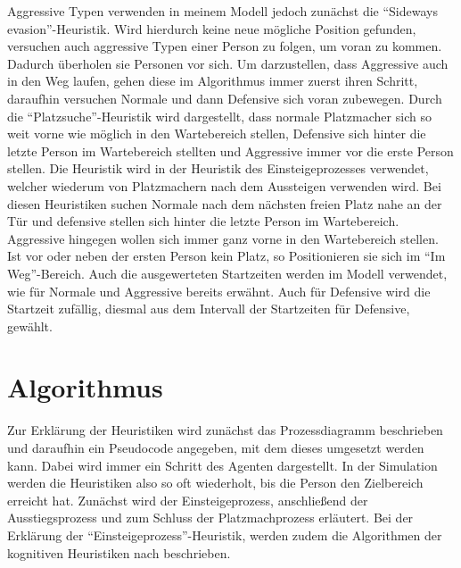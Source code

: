 Aggressive Typen verwenden in meinem Modell jedoch zunächst die "`Sideways evasion"'-Heuristik. Wird hierdurch keine neue mögliche Position gefunden, versuchen auch aggressive Typen einer Person zu folgen, um voran zu kommen. Dadurch überholen sie Personen vor sich. Um darzustellen, dass Aggressive auch in den Weg laufen, gehen diese im Algorithmus immer zuerst ihren Schritt, daraufhin versuchen Normale und dann Defensive sich voran zubewegen. Durch die "`Platzsuche"'-Heuristik wird dargestellt, dass normale Platzmacher sich so weit vorne wie möglich in den Wartebereich stellen, Defensive sich hinter die letzte Person im Wartebereich stellten und Aggressive immer vor die erste Person stellen. Die Heuristik wird in der Heuristik des Einsteigeprozesses verwendet, welcher wiederum von Platzmachern nach dem Aussteigen verwenden wird. Bei diesen Heuristiken suchen Normale nach dem nächsten freien Platz nahe an der Tür und defensive stellen sich hinter die letzte Person im Wartebereich. Aggressive hingegen wollen sich immer ganz vorne in den Wartebereich stellen. Ist vor oder neben der ersten Person kein Platz, so Positionieren sie sich im "`Im Weg"'-Bereich. Auch die ausgewerteten Startzeiten werden im Modell verwendet, wie für Normale und Aggressive bereits erwähnt. Auch für Defensive wird die Startzeit zufällig, diesmal aus dem Intervall der Startzeiten für Defensive, gewählt.
\section{Algorithmus} \label{Algorithmus}
Zur Erklärung der Heuristiken wird zunächst das Prozessdiagramm beschrieben und daraufhin ein Pseudocode angegeben, mit dem dieses umgesetzt werden kann. Dabei wird immer ein Schritt des Agenten dargestellt. In der Simulation werden die Heuristiken also so oft wiederholt, bis die Person den Zielbereich erreicht hat. Zunächst wird der Einsteigeprozess, anschließend der Ausstiegsprozess und zum Schluss der Platzmachprozess erläutert. Bei der Erklärung der "`Einsteigeprozess"'-Heuristik, werden zudem die Algorithmen der kognitiven Heuristiken nach \cite{Seitz.2016} beschrieben.
